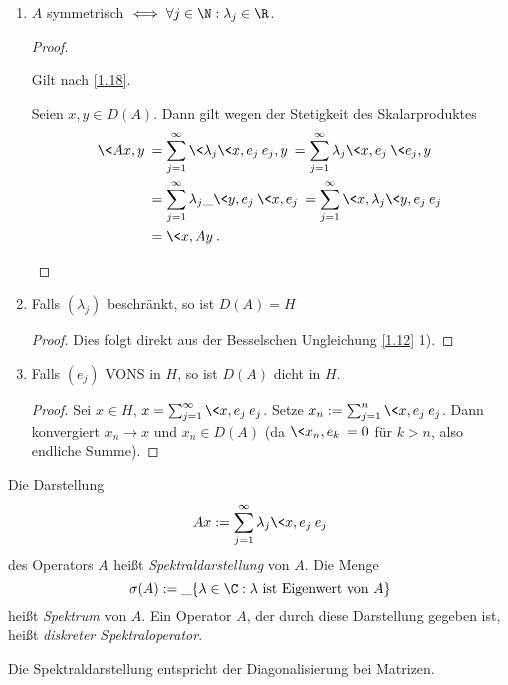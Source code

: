 \begin{ex}
\begin{enumerate}[1)]
\begin{enumerate}[a)]
\begin{proof}
\[						\]
						\qedhere
					\end{proof}
			\end{enumerate}
		\item
			$A$ symmetrisch $\iff \forall j \in \N : \lambda_j \in \R$.
			\begin{proof}
				\begin{seg}[$\implies$]
					Gilt nach \ref{1.18}.
				\end{seg}
				\begin{seg}[$\Longleftarrow$]
					Seien $x,y \in D(A)$. Dann gilt wegen der Stetigkeit des Skalarproduktes
					\begin{align*}
						\<Ax,y\>
						&= \sum_{j=1}^\infty \<\lambda_j \<x,e_j\> e_j, y\> 
						= \sum_{j=1}^\infty \lambda_j \<x,e_j\> \<e_j, y\> \\
						&= \sum_{j=1}^\infty \lambda_j \_{\<y,e_j\>} \<x, e_j\> 
						= \sum_{j=1}^\infty \<x,\lambda_j \<y,e_j\> e_j\> \\
						&= \<x, Ay\>.
					\end{align*}
				\end{seg}
				\qedhere
			\end{proof}
		\item
			Falls $(\lambda_j)$ beschränkt, so ist $D(A) = H$
			\begin{proof}
				Dies folgt direkt aus der Besselschen Ungleichung \ref{1.12} 1).
			\end{proof}
		\item
			Falls $(e_j)$ VONS in $H$, so ist $D(A)$ dicht in $H$.
			\begin{proof}
				Sei $x \in H$, $x = \sum_{j=1}^\infty \<x,e_j\> e_j$.
				Setze $x_n := \sum_{j=1}^n \<x,e_j\> e_j$.
				Dann konvergiert $x_n \to x$ und $x_n \in D(A)$ (da $\<x_n,e_k\> = 0$ für $k > n$, also endliche Summe).
			\end{proof}
	\end{enumerate}
\end{ex}

\begin{df} \label{1.20}
	Die Darstellung 
	\[
		Ax := \sum_{j=1}^\infty \lambda_j \<x,e_j\> e_j
	\]
	des Operators $A$ heißt \emph{Spektraldarstellung} von $A$.
	Die Menge
	\[
		\sigma(A) := \_{\{\lambda \in \C : \lambda \text{ ist Eigenwert von $A$} \}}
	\]
	heißt \emph{Spektrum} von $A$.
	Ein Operator $A$, der durch diese Darstellung gegeben ist, heißt \emph{diskreter Spektraloperator}.
	\begin{note}
		Die Spektraldarstellung entspricht der Diagonalisierung bei Matrizen.
	\end{note}
\end{df}

